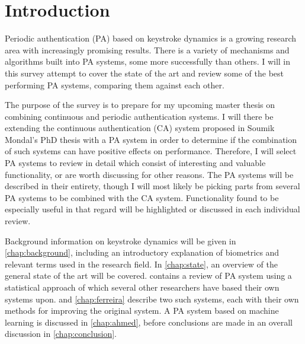 \documentclass[informationsecurity]{gucmasterproject}
\begin{document}
\thesisdate{\gucmasterthesisdate}
\makefrontpages %





\begin{abstract}


\end{abstract}


\tableofcontents
\chapter{Introduction}
\label{chap:introduction}

Periodic authentication (PA) based on keystroke dynamics is a growing research area with increasingly promising results.
There is a variety of mechanisms and algorithms built into PA systems, some more successfully than others.
I will in this survey attempt to cover the state of the art and review some of the best performing PA systems, comparing them against each other.

The purpose of the survey is to prepare for my upcoming master thesis on combining continuous and periodic authentication systems.
I will there be extending the continuous authentication (CA) system proposed in Soumik Mondal's PhD thesis \cite{mondal} with a PA system in order to determine if the combination of such systems can have positive effects on performance.
Therefore, I will select PA systems to review in detail which consist of interesting and valuable functionality, or are worth discussing for other reasons.
The PA systems will be described in their entirety, though I will most likely be picking parts from several PA systems to be combined with the CA system.
Functionality found to be especially useful in that regard will be highlighted or discussed in each individual review.

Background information on keystroke dynamics will be given in \cref{chap:background}, including an introductory explanation of biometrics and relevant terms used in the research field.
In \cref{chap:state}, an overview of the general state of the art will be covered.
 contains a review of PA system using a statistical approach of which several other researchers have based their own systems upon.
 and \cref{chap:ferreira} describe two such systems, each with their own methods for improving the original system.
A PA system based on machine learning is discussed in \cref{chap:ahmed}, before conclusions are made in an overall discussion in \cref{chap:conclusion}.
\end{document}
